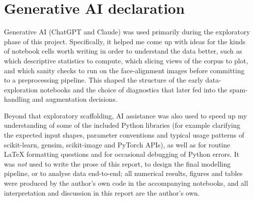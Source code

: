 \documentclass[11pt,a4paper]{article}
\begin{document}

\section*{Generative AI declaration}


Generative AI (ChatGPT and Claude) was used primarily during the
exploratory phase of this project. Specifically, it helped me come up
with ideas for the kinds of notebook cells worth writing in order to
understand the data better, such as which descriptive statistics to
compute, which slicing views of the corpus to plot, and which sanity
checks to run on the face-alignment images before committing to a
preprocessing pipeline. This shaped the structure of the early
data-exploration notebooks and the choice of diagnostics that later fed
into the spam-handling and augmentation decisions.

Beyond that exploratory scaffolding, AI assistance was also used to
speed up my understanding of some of the included Python libraries
(for example clarifying the expected input shapes, parameter
conventions and typical usage patterns of scikit-learn, gensim,
scikit-image and PyTorch APIs), as well as for routine LaTeX
formatting questions and for occasional debugging of Python errors. It was \emph{not} used to write the prose of this
report, to design the final modelling pipeline, or to analyse data
end-to-end; all numerical results, figures and tables were produced by
the author's own code in the accompanying notebooks, and all
interpretation and discussion in this report are the author's own.



\end{document}
